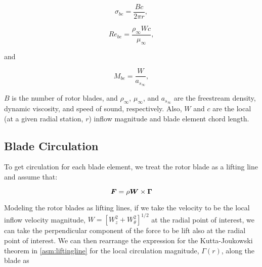 \begin{equation}
    \label{eqn:solidity}
    \sigma_{be} = \frac{Bc}{2\pi r},
\end{equation}

\begin{equation}
    \label{eqn:re}
    Re_{be} = \frac{\rho_\infty W c}{\mu_\infty},
\end{equation}

\noindent and

\begin{equation}
    \label{eqn:ma}
    M_{be} = \frac{W}{a_{s_\infty}},
\end{equation}

\where \(B\) is the number of rotor blades, and \(\rho_\infty\), \(\mu_\infty\), and \(a_{s_\infty}\) are the freestream density, dynamic viscosity, and speed of sound, respectively.
%
Also, \(W\) and \(c\) are the local (at a given radial station, \(r\)) inflow magnitude and blade element chord length.



\subsection{Blade Circulation}
\label{ssec:bladecirculation}

To get circulation for each blade element, we treat the rotor blade as a lifting line and assume that:

\begin{assumption}
\label{asm:liftingline}


    \[ \bm{F} = \rho \bm{W} \times \bm{\Gamma} \]



\end{assumption}

Modeling the rotor blades as lifting lines, if we take the velocity to be the local inflow velocity magnitude, \(W=\left[W_z^2+W_\theta^2\right]^{1/2}\) at the radial point of interest, we can take the perpendicular component of the force to be lift also at the radial point of interest.
%
We can then rearrange the expression for the Kutta-Joukowski theorem in \cref{asm:liftingline} for the local circulation magnitude, \(\Gamma(r)\), along the blade as

